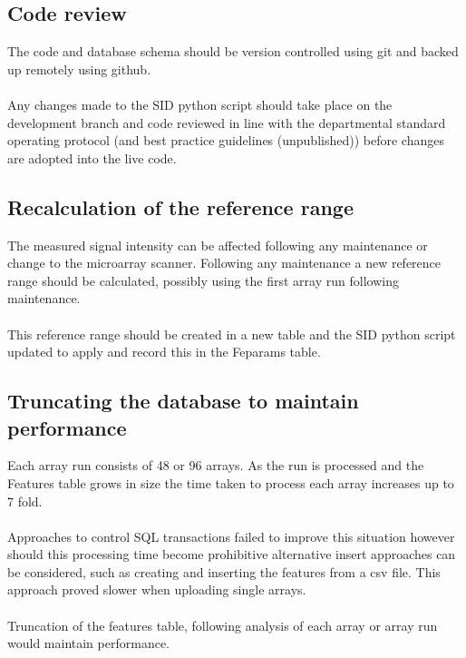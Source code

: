 \subsection{Code review}
The code and database schema should be version controlled using git and backed up remotely using github. 
\paragraph*{}
Any changes made to the SID python script should take place on the development branch and code reviewed in line with the departmental standard operating protocol (and best practice guidelines (unpublished)) before changes are adopted into the live code.
 
\subsection{Recalculation of the reference range}
The measured signal intensity can be affected following any maintenance or change to the microarray scanner. Following any maintenance a new reference range should be calculated, possibly using the first array run following maintenance. 
\paragraph*{}
This reference range should be created in a new table and the SID python script updated to apply and record this in the Feparams table.

\subsection{Truncating the database to maintain performance}
Each array run consists of 48 or 96 arrays. As the run is processed and the Features table grows in size the time taken to process each array increases up to 7 fold.
\paragraph*{}
Approaches to control SQL transactions failed to improve this situation however should this processing time become prohibitive alternative insert approaches can be considered, such as creating and inserting the features from a \ac{csv} file. This approach proved slower when uploading single arrays.
\paragraph*{}
Truncation of the features table, following analysis of each array or array run would maintain performance.
